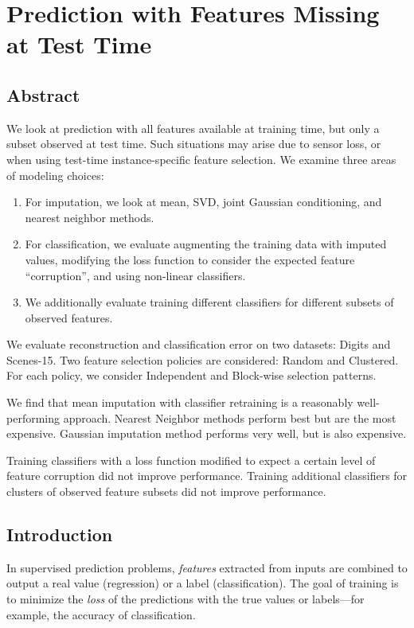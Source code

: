 \chapter{Prediction with Features Missing at Test Time}

\section{Abstract}
We look at prediction with all features available at training time, but only a subset observed at test time.
Such situations may arise due to sensor loss, or when using test-time instance-specific feature selection.
We examine three areas of modeling choices:

\begin{enumerate}
\item For imputation, we look at mean, SVD, joint Gaussian conditioning, and nearest neighbor methods.

\item For classification, we evaluate augmenting the training data with imputed values, modifying the loss function to consider the expected feature ``corruption'', and using non-linear classifiers.

\item We additionally evaluate training different classifiers for different subsets of observed features.
\end{enumerate}

We evaluate reconstruction and classification error on two datasets: Digits and Scenes-15.
Two feature selection policies are considered: Random and Clustered.
For each policy, we consider Independent and Block-wise selection patterns.

We find that mean imputation with classifier retraining is a reasonably well-performing approach.
Nearest Neighbor methods perform best but are the most expensive.
Gaussian imputation method performs very well, but is also expensive.

Training classifiers with a loss function modified to expect a certain level of feature corruption did not improve performance.
Training additional classifiers for clusters of observed feature subsets did not improve performance.

\section{Introduction}
In supervised prediction problems, \emph{features} extracted from inputs are combined to output a real value (regression) or a label (classification).
The goal of training is to minimize the \emph{loss} of the predictions with the true values or labels---for example, the accuracy of classification.

